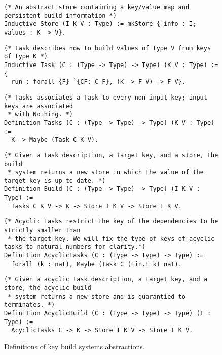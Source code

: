 \documentclass[sigplan,review]{acmart}\settopmatter{printfolios=true,printccs=false,printacmref=false}
\begin{document}
\begin{figure*}[t]
\begin{verbatim}
(* An abstract store containing a key/value map and persistent build information *)
Inductive Store (I K V : Type) := mkStore { info : I; values : K -> V}.
\end{verbatim}
\vspace{-1mm}
\begin{verbatim}
(* Task describes how to build values of type V from keys of type K *)
Inductive Task (C : (Type -> Type) -> Type) (K V : Type) := {
  run : forall {F} `{CF: C F}, (K -> F V) -> F V}.
\end{verbatim}
\vspace{-1mm}
\begin{verbatim}
(* Tasks associates a Task to every non-input key; input keys are associated
 * with Nothing. *)
Definition Tasks (C : (Type -> Type) -> Type) (K V : Type) :=
  K -> Maybe (Task C K V).
\end{verbatim}
\vspace{-1mm}
\begin{verbatim}
(* Given a task description, a target key, and a store, the build
 * system returns a new store in which the value of the target key is up to date. *)
Definition Build (C : (Type -> Type) -> Type) (I K V : Type) :=
  Tasks C K V -> K -> Store I K V -> Store I K V.
\end{verbatim}
\vspace{-1mm}
\begin{verbatim}
(* Acyclic Tasks restrict the key of the dependencies to be strictly smaller than
 * the target key. We will fix the type of keys of acyclic tasks to natural numbers for clarity.*)
Definition AcyclicTasks (C : (Type -> Type) -> Type) :=
  forall (k : nat), Maybe (Task C (Fin.t k) nat).
\end{verbatim}
\vspace{-1mm}
\begin{verbatim}
(* Given a acyclic task description, a target key, and a store, the acyclic build
 * system returns a new store and is guarantied to terminates. *)
Definition AcyclicBuild (C : (Type -> Type) -> Type) (I : Type) :=
  AcyclicTasks C -> K -> Store I K V -> Store I K V.
\end{verbatim}
\vspace{-3mm}
\caption{Definitions of key build systems abstractions.}\label{fig-defs}
\vspace{-5mm}
\end{figure*}
\end{document}
